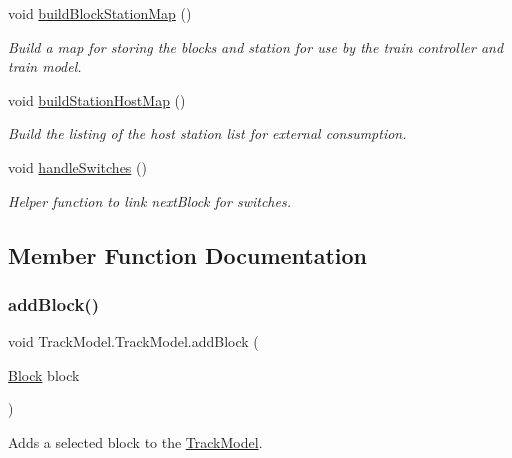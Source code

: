 \begin{DoxyCompactItemize}
void \hyperlink{classTrackModel_1_1TrackModel_a09958c9377126378d1efe5054e246405}{build\+Block\+Station\+Map} ()
\begin{DoxyCompactList}\small\item\em Build a map for storing the blocks and station for use by the train controller and train model. \end{DoxyCompactList}\item 
void \hyperlink{classTrackModel_1_1TrackModel_a6956005761fa4dbe6272088f5f2a2718}{build\+Station\+Host\+Map} ()
\begin{DoxyCompactList}\small\item\em Build the listing of the host station list for external consumption. \end{DoxyCompactList}\item 
void \hyperlink{classTrackModel_1_1TrackModel_a468c19408a6939f20fa6e66b20f8e8ac}{handle\+Switches} ()
\begin{DoxyCompactList}\small\item\em Helper function to link next\+Block for switches. \end{DoxyCompactList}\end{DoxyCompactItemize}


\subsection{Member Function Documentation}
\mbox{\label{classTrackModel_1_1TrackModel_aeeec35a2eb38afc82b87fd310f161e9e}} 
\subsubsection{\texorpdfstring{add\+Block()}{addBlock()}}
{\footnotesize\ttfamily void Track\+Model.\+Track\+Model.\+add\+Block (\begin{DoxyParamCaption}\item[{\hyperlink{classTrackModel_1_1Block}{Block}}]{block }\end{DoxyParamCaption})\hspace{0.3cm}{\ttfamily [private]}}



Adds a selected block to the \hyperlink{classTrackModel_1_1TrackModel}{Track\+Model}. 

